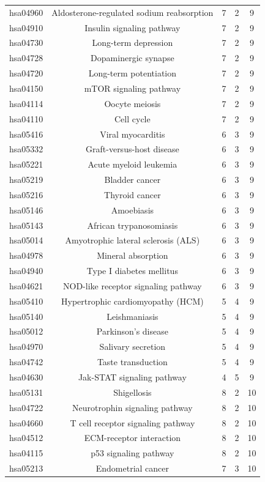\documentclass[Minh_PhD_thesis.tex]{subfiles}
\begin{document}
\begin{center}
\begin{longtable}{@{}ccccc@{}}
hsa04960	&Aldosterone-regulated sodium reabsorption&	7&	2&	9\\
hsa04910	&Insulin signaling pathway&	7&	2&	9\\
hsa04730	&Long-term depression&	7&	2&	9\\
hsa04728	&Dopaminergic synapse&	7&	2&	9\\
hsa04720	&Long-term potentiation&	7&	2&	9\\
hsa04150	&mTOR signaling pathway&	7&	2&	9\\
hsa04114	&Oocyte meiosis&	7&	2&	9\\
hsa04110	&Cell cycle&	7&	2&	9\\
hsa05416	&Viral myocarditis&	6&	3&	9\\
hsa05332	&Graft-versus-host disease&	6&	3&	9\\
hsa05221	&Acute myeloid leukemia&	6&	3&	9\\
hsa05219	&Bladder cancer&	6&	3&	9\\
hsa05216	&Thyroid cancer&	6&	3&	9\\
hsa05146	&Amoebiasis&	6&	3&	9\\
hsa05143	&African trypanosomiasis&	6&	3&	9\\
hsa05014	&Amyotrophic lateral sclerosis (ALS)&	6&	3&	9\\
hsa04978	&Mineral absorption&	6&	3&	9\\
hsa04940	&Type I diabetes mellitus&	6&	3&	9\\
hsa04621	&NOD-like receptor signaling pathway&	6&	3&	9\\
hsa05410	&Hypertrophic cardiomyopathy (HCM)&	5&	4&	9\\
hsa05140	&Leishmaniasis	&5&	4&	9\\
hsa05012	&Parkinson's disease&	5&	4&	9\\
hsa04970	&Salivary secretion&	5&	4&	9\\
hsa04742	&Taste transduction&	5&	4&	9\\
hsa04630	&Jak-STAT signaling pathway&	4&	5&	9\\
hsa05131	&Shigellosis&	8&	2&	10\\
hsa04722	&Neurotrophin signaling pathway&	8&	2	&10\\
hsa04660	&T cell receptor signaling pathway	&8	&2&	10\\
hsa04512	&ECM-receptor interaction&	8&	2&	10\\
hsa04115	&p53 signaling pathway&	8&	2&	10\\
hsa05213	&Endometrial cancer	&7&	3&	10\\

\end{longtable}
\end{center}
\end{document}

